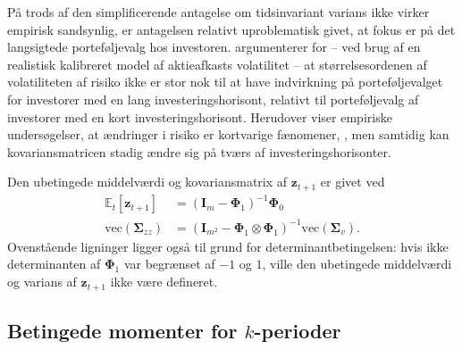 \documentclass[
  a4paper,
  oneside]{memoir}
\begin{document}
\vspace{5mm}

På trods af den simplificerende antagelse om tidsinvariant varians ikke virker empirisk sandsynlig, er antagelsen relativt uproblematisk givet, at fokus er på det langsigtede porteføljevalg hos investoren. \citep{Chacko2005} argumenterer for -- ved brug af en realistisk kalibreret model af aktieafkasts volatilitet -- at størrelsesordenen af volatiliteten af risiko ikke er stor nok til at have indvirkning på porteføljevalget for investorer med en lang investeringshorisont, relativt til porteføljevalg af investorer med en kort investeringshorisont. Herudover viser empiriske undersøgelser, at ændringer i risiko er kortvarige fænomener, \citep{Camp1987}, men samtidig kan kovariansmatricen stadig ændre sig på tværs af investeringshorisonter.

\vspace{5mm}

Den ubetingede middelværdi og kovariansmatrix af \(\bm{z}_{t+1}\) er givet ved
\begin{align*}
        \mathbb{E}_t\left[\bm{z}_{t+1}\right] &= (\bm{I}_m-\bm{\Phi}_1)^{-1}\bm{\Phi}_0\\
        \text{vec}(\bm{\Sigma}_{zz}) &= (\bm{I}_{m^2}-\bm{\Phi}_1\otimes\bm{\Phi}_1)^{-1}\text{vec}(\bm{\Sigma}_v).
    \end{align*}
Ovenstående ligninger ligger også til grund for determinantbetingelsen: hvis ikke determinanten af \(\bm{\Phi}_1\) var begrænset af \(-1\) og \(1\), ville den ubetingede middelværdi og varians af \(\bm{z}_{t+1}\) ikke være defineret.

\subsection{Betingede momenter for $k$-perioder}
\end{document}
